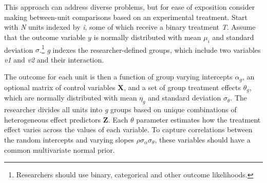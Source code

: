 \documentclass[12pt]{article}
\begin{document}
This approach can address diverse problems, but for ease of exposition consider making between-unit comparisons based on an experimental treatment.    
Start with \textit{N} units indexed by \textit{i}, some of which receive a binary treatment \textit{T}.
Assume that the outcome variable ${y}$ is normally distributed with mean $\mu_i$ and standard deviation $\sigma$.\footnote{Researchers should use binary, categorical and other outcome likelihoods.}
\textit{g} indexes the researcher-defined groups, which include two variables \textit{v1} and \textit{v2} and their interaction.


The outcome for each unit is then a function of group varying intercepts $\alpha_g$, an optional matrix of control variables \textbf{X}, and a set of group treatment effects $\theta_g$, which are normally distributed with mean $\eta_g$ and standard deviation $\sigma_\theta$. 
The researcher divides all units into \textit{g} groups based on unique combinations of heterogeneous effect predictors \textbf{Z}. 
Each $\theta$ parameter estimates how the treatment effect varies across the values of  each variable.  
To capture correlations between the random intercepts and varying slopes $\rho \sigma_\alpha \sigma_\theta$, these variables should have a common multivariate normal prior.
\end{document}

